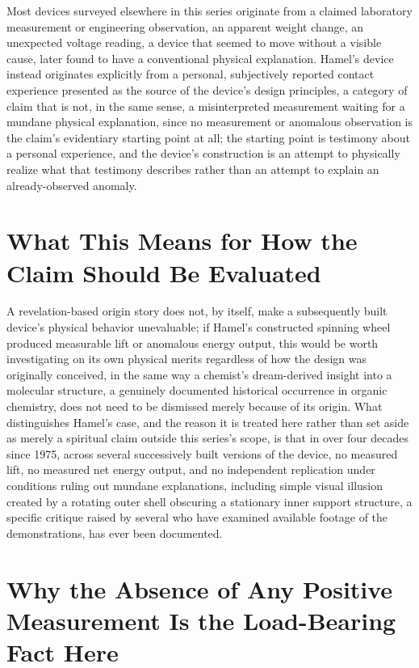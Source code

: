 \documentclass[11pt]{article}
\begin{document}
Most devices surveyed elsewhere in this series originate from a claimed laboratory measurement or engineering observation, an apparent weight change, an unexpected voltage reading, a device that seemed to move without a visible cause, later found to have a conventional physical explanation. Hamel's device instead originates explicitly from a personal, subjectively reported contact experience presented as the source of the device's design principles, a category of claim that is not, in the same sense, a misinterpreted measurement waiting for a mundane physical explanation, since no measurement or anomalous observation is the claim's evidentiary starting point at all; the starting point is testimony about a personal experience, and the device's construction is an attempt to physically realize what that testimony describes rather than an attempt to explain an already-observed anomaly.

\section{What This Means for How the Claim Should Be Evaluated}

A revelation-based origin story does not, by itself, make a subsequently built device's physical behavior unevaluable; if Hamel's constructed spinning wheel produced measurable lift or anomalous energy output, this would be worth investigating on its own physical merits regardless of how the design was originally conceived, in the same way a chemist's dream-derived insight into a molecular structure, a genuinely documented historical occurrence in organic chemistry, does not need to be dismissed merely because of its origin. What distinguishes Hamel's case, and the reason it is treated here rather than set aside as merely a spiritual claim outside this series's scope, is that in over four decades since 1975, across several successively built versions of the device, no measured lift, no measured net energy output, and no independent replication under conditions ruling out mundane explanations, including simple visual illusion created by a rotating outer shell obscuring a stationary inner support structure, a specific critique raised by several who have examined available footage of the demonstrations, has ever been documented.

\section{Why the Absence of Any Positive Measurement Is the Load-Bearing Fact Here}
\end{document}
